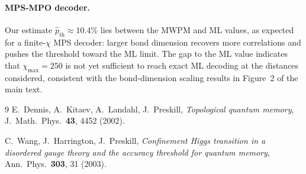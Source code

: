 \documentclass[11pt, a4paper]{article}
\begin{document}
\paragraph{MPS-MPO decoder.}
Our estimate $\hat{p}_{\mathrm{th}} \approx 10.4\%$ lies between the MWPM and
ML values, as expected for a finite-$\chi$ MPS decoder: larger bond dimension
recovers more correlations and pushes the threshold toward the ML limit.
The gap to the ML value indicates that $\chi_{\max} = 250$ is not yet
sufficient to reach exact ML decoding at the distances considered, consistent
with the bond-dimension scaling results in Figure~2 of the main text.

\begin{thebibliography}{9}
E.\ Dennis, A.\ Kitaev, A.\ Landahl, J.\ Preskill,
\textit{Topological quantum memory},
J.\ Math.\ Phys.\ \textbf{43}, 4452 (2002).

C.\ Wang, J.\ Harrington, J.\ Preskill,
\textit{Confinement Higgs transition in a disordered gauge theory and the
accuracy threshold for quantum memory},
Ann.\ Phys.\ \textbf{303}, 31 (2003).
\end{thebibliography}
\end{document}
